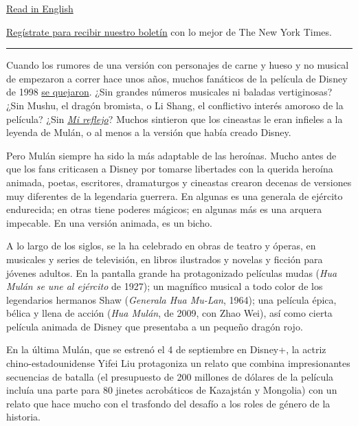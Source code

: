 \href{https://www.nytimes3xbfgragh.onion/2020/09/03/movies/mulan-history.html}{Read
in English}

\href{https://www.nytimes3xbfgragh.onion/newsletters/el-times}{Regístrate
para recibir nuestro boletín} con lo mejor de The New York Times.

\begin{center}\rule{0.5\linewidth}{\linethickness}\end{center}

Cuando los rumores de una versión con personajes de carne y hueso y no
musical de empezaron a correr hace unos años, muchos fanáticos de la
película de Disney de 1998
\href{https://www.slashfilm.com/mulan-remake-is-not-a-musical/}{se
quejaron}. ¿Sin grandes números musicales ni baladas vertiginosas? ¿Sin
Mushu, el dragón bromista, o Li Shang, el conflictivo interés amoroso de
la película? ¿Sin
\href{https://www.youtube.com/watch?v=sL9bUSfaO6M}{\emph{Mi reflejo}}?
Muchos sintieron que los cineastas le eran infieles a la leyenda de
Mulán, o al menos a la versión que había creado Disney.

Pero Mulán siempre ha sido la más adaptable de las heroínas. Mucho antes
de que los fans criticasen a Disney por tomarse libertades con la
querida heroína animada, poetas, escritores, dramaturgos y cineastas
crearon decenas de versiones muy diferentes de la legendaria guerrera.
En algunas es una generala de ejército endurecida; en otras tiene
poderes mágicos; en algunas más es una arquera impecable. En una versión
animada, es un bicho.

A lo largo de los siglos, se la ha celebrado en obras de teatro y
óperas, en musicales y series de televisión, en libros ilustrados y
novelas y ficción para jóvenes adultos. En la pantalla grande ha
protagonizado películas mudas (\emph{Hua Mulán se une al ejército} de
1927); un magnífico musical a todo color de los legendarios hermanos
Shaw (\emph{Generala Hua Mu-Lan}, 1964); una película épica, bélica y
llena de acción (\emph{Hua Mulán}, de 2009, con Zhao Wei), así como
cierta película animada de Disney que presentaba a un pequeño dragón
rojo.

En la última Mulán, que se estrenó el 4 de septiembre en Disney+, la
actriz chino-estadounidense Yifei Liu protagoniza un relato que combina
impresionantes secuencias de batalla (el presupuesto de 200 millones de
dólares de la película incluía una parte para 80 jinetes acrobáticos de
Kazajstán y Mongolia) con un relato que hace mucho con el trasfondo del
desafío a los roles de género de la historia.

